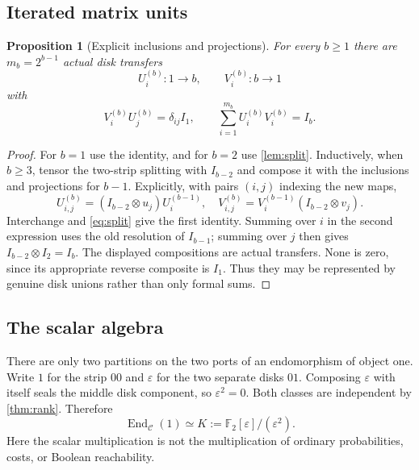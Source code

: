 \documentclass[11pt,a4paper]{article}
\newtheorem{proposition}[proposition]{Proposition}
\theoremstyle{definition}
\newcommand{\F}{\mathbb F_2}
\newcommand{\End}{\operatorname{End}}
\newcommand{\eps}{\varepsilon}
\begin{document}
\subsection{Iterated matrix units}
\begin{proposition}[Explicit inclusions and projections]\label{prop:units}
For every $b\ge1$ there are $m_b=2^{b-1}$ actual disk transfers
\[
U_i^{(b)}:1\to b,\qquad V_i^{(b)}:b\to1
\]
with
\begin{equation}
V_i^{(b)}U_j^{(b)}=\delta_{ij}I_1,
\qquad \sum_{i=1}^{m_b}U_i^{(b)}V_i^{(b)}=I_b.
\label{eq:units}
\end{equation}
\end{proposition}
\begin{proof}
For $b=1$ use the identity, and for $b=2$ use \cref{lem:split}. Inductively, when $b\ge3$, tensor the two-strip splitting with $I_{b-2}$ and compose it with the inclusions and projections for $b-1$. Explicitly, with pairs $(i,j)$ indexing the new maps,
\[
U_{i,j}^{(b)}=(I_{b-2}\otimes u_j)U_i^{(b-1)},
\quad
V_{i,j}^{(b)}=V_i^{(b-1)}(I_{b-2}\otimes v_j).
\]
Interchange and \eqref{eq:split} give the first identity. Summing over $i$ in the second expression uses the old resolution of $I_{b-1}$; summing over $j$ then gives $I_{b-2}\otimes I_2=I_b$. The displayed compositions are actual transfers. None is zero, since its appropriate reverse composite is $I_1$. Thus they may be represented by genuine disk unions rather than only formal sums.
\end{proof}

\subsection{The scalar algebra}
There are only two partitions on the two ports of an endomorphism of object one. Write $1$ for the strip $00$ and $\eps$ for the two separate disks $01$. Composing $\eps$ with itself seals the middle disk component, so $\eps^2=0$. Both classes are independent by \cref{thm:rank}. Therefore
\begin{equation}
\End_{\mathcal C}(1)\simeq K:=\F[\eps]/(\eps^2).
\label{eq:dual}
\end{equation}
Here the scalar multiplication is not the multiplication of ordinary probabilities, costs, or Boolean reachability.
\end{document}
